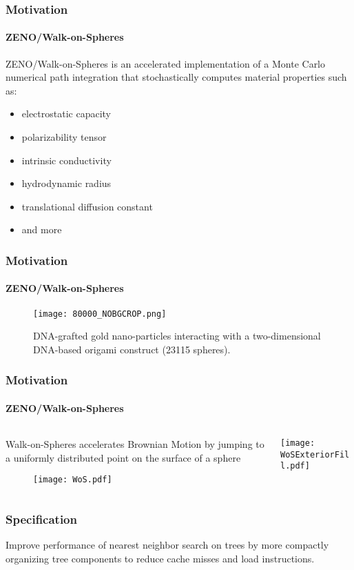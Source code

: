 \begin{frame}
  \frametitle{Motivation}
  \framesubtitle{ZENO/Walk-on-Spheres}

  {\color{white}\Large%
  ZENO/Walk-on-Spheres is an accelerated implementation of a Monte Carlo
    numerical path integration that stochastically computes material properties
    such as:
  }
  \begin{itemize}
      \large%
    \item electrostatic capacity
    \item polarizability tensor
    \item intrinsic conductivity 
    \item hydrodynamic radius
    \item translational diffusion constant
    \item and more
  \end{itemize}
\end{frame}

\begin{frame}
  \frametitle{Motivation}
  \framesubtitle{ZENO/Walk-on-Spheres}

  \begin{figure}
    \centering
    \texttt{[image: 80000\_NOBGCROP.png]}
    \caption{DNA-grafted gold nano-particles interacting with a 
    two-dimensional DNA-based origami construct (23115 spheres).}
    \label{fig:80000}
  \end{figure}
\end{frame}


\begin{frame}
  \frametitle{Motivation}
  \framesubtitle{ZENO/Walk-on-Spheres}

  \begin{columns}[T]
    \begin{column}{.5\textwidth}
      \begin{block}{}%
        {\color{white} Walk-on-Spheres accelerates Brownian Motion by jumping %
          to a uniformly distributed point on the surface of a sphere}
      \end{block}
      \vspace{-0.6cm}%
      \begin{block}{}%
        \begin{figure}
          \centering
          \texttt{[image: WoS.pdf]}
        \end{figure}
      \end{block}
    \end{column}
    \begin{column}{.5\textwidth}
      \begin{block}{}%
        \texttt{[image: WoSExteriorFill.pdf]}
      \end{block}
    \end{column}
  \end{columns}
\end{frame}

\begin{frame}
  \frametitle{Specification}

  {\color{white}
  Improve performance of nearest neighbor search on \kd trees by more compactly organizing tree components
  to reduce cache misses and load instructions.}

\end{frame}

